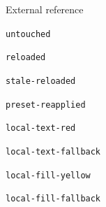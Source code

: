 \documentclass{article}
\begin{document}

\noindent External reference\par
{}
\par\noindent\texttt{untouched}\par


\par\noindent\texttt{reloaded}\par


\par\noindent\texttt{stale-reloaded}\par


\par\noindent\texttt{preset-reapplied}\par


\par\noindent\texttt{local-text-red}\par


\par\noindent\texttt{local-text-fallback}\par


\par\noindent\texttt{local-fill-yellow}\par


\par\noindent\texttt{local-fill-fallback}\par

\end{document}
